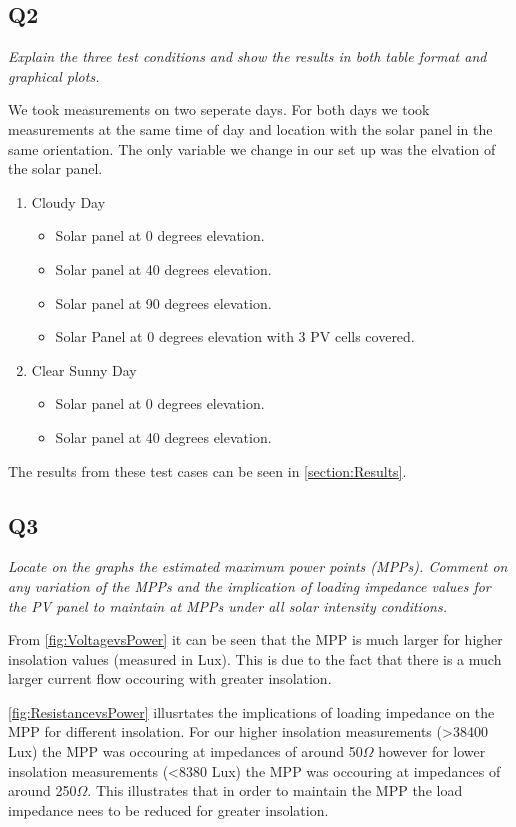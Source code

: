 \documentclass{article}
\begin{document}
	\subsection{Q2}
		\textit{Explain the three test conditions and show the results in both table format and graphical plots.}
		
		
		We took measurements on two seperate days. For both days we took measurements at the same time of day and location with the solar panel in the same orientation. The only variable we change in our set up was the elvation of the solar panel.
		\begin{enumerate}
			\item Cloudy Day
			\begin{itemize}
				\item Solar panel at 0 degrees elevation.
				\item Solar panel at 40 degrees elevation.
				\item Solar panel at 90 degrees elevation.
				\item Solar Panel at 0 degrees elevation with 3 PV cells covered.
			\end{itemize}
			\item Clear Sunny Day
			\begin{itemize}
				\item Solar panel at 0 degrees elevation.
				\item Solar panel at 40 degrees elevation.
			\end{itemize}
		\end{enumerate}	
	
	The results from these test cases can be seen in \cref{section:Results}.
	
	\subsection{Q3}
		\textit{Locate on the graphs the estimated maximum power points (MPPs). Comment on any variation of the MPPs and the implication of loading impedance values for the PV panel to maintain at MPPs under all solar intensity conditions.}
		
		From \cref{fig:VoltagevsPower} it can be seen that the MPP is much larger for higher insolation values (measured in Lux). This is due to the fact that there is a much larger current flow occouring with greater insolation.
		
		\cref{fig:ResistancevsPower} illusrtates the implications of loading impedance on the MPP for different insolation. For our higher insolation measurements (>38400 Lux) the MPP was occouring at impedances of around 50$ \Omega $ however for lower insolation measurements (<8380 Lux) the MPP was occouring at impedances of around 250$ \Omega $. This illustrates that in order to maintain the MPP the load impedance nees to be reduced for greater insolation.
	
\end{document}
